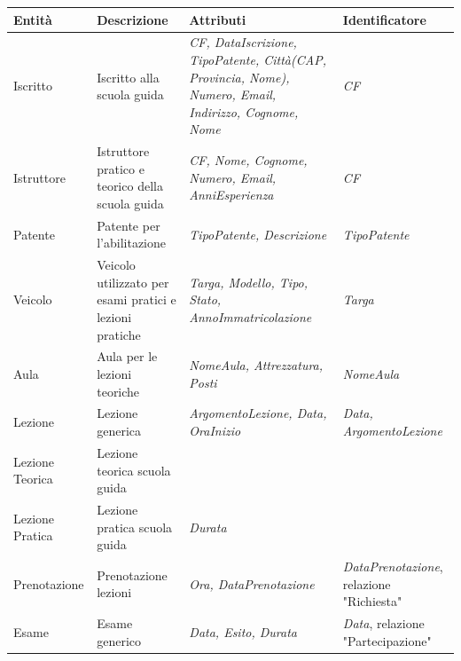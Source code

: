 \documentclass[10pt,twoside]{article}
\begin{document}
{     \begin{table}[H]
        \centering
        \begin{tabularx}{\textwidth}{|>{\centering\arraybackslash}p{2.6cm}|>{\centering\arraybackslash}X|>{\centering\arraybackslash}p{4.85cm}|>{\centering\arraybackslash}X|}
            \hline
            \rowcolor{lightgray!40}
            \textbf{Entità} & \textbf{Descrizione} & \textbf{Attributi} & \textbf{Identificatore} \\
            \hline
            \rowcolor{white!40}
            Iscritto & Iscritto alla scuola guida & \textit{CF, DataIscrizione, TipoPatente, Città(CAP, Provincia, Nome), Numero, Email, Indirizzo, Cognome, Nome} & \textit{CF}\\
            \hline
            \rowcolor{white!40}
            Istruttore & Istruttore pratico e teorico della scuola guida & \textit{CF, Nome, Cognome, Numero, Email, AnniEsperienza} & \textit{CF} \\
            \hline
            \rowcolor{white!40}
            Patente & Patente per l'abilitazione & \textit{TipoPatente, Descrizione} & \textit{TipoPatente}\\
            \hline
            \rowcolor{white!40}
            Veicolo & Veicolo utilizzato per esami pratici e lezioni pratiche & \textit{Targa, Modello, Tipo, Stato, AnnoImmatricolazione} & \textit{Targa}\\
            \hline
            \rowcolor{white!40}
            Aula & Aula per le lezioni teoriche & \textit{NomeAula, Attrezzatura, Posti} & \textit{NomeAula}\\
            \hline
            \rowcolor{white!40}
            Lezione & Lezione generica & \textit{ArgomentoLezione, Data, OraInizio} & \textit{Data, ArgomentoLezione}\\
            \hline
            \rowcolor{white!40}
            Lezione Teorica & Lezione teorica scuola guida & & \\
            \hline
            \rowcolor{white!40}
            Lezione Pratica & Lezione pratica scuola guida & \textit{Durata} & \\
            \hline
            \rowcolor{white!40}
            Prenotazione & Prenotazione lezioni & \textit{Ora, DataPrenotazione} & \textit{DataPrenotazione}, relazione "Richiesta"\\
            \hline
            \rowcolor{white!40}
            Esame & Esame generico & \textit{Data, Esito, Durata} & \textit{Data}, relazione "Partecipazione"\\

\end{tabularx}
\end{table}}
\end{document}
